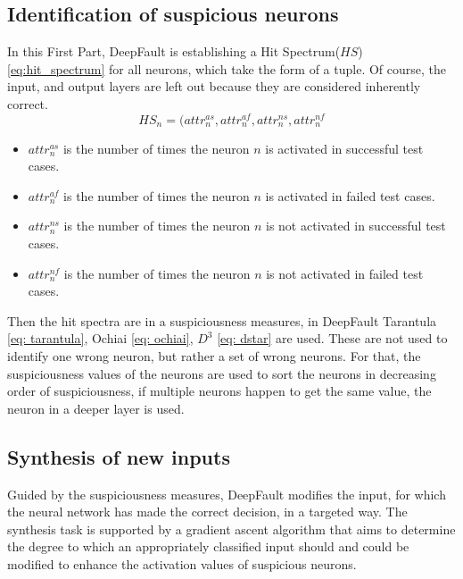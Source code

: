 \subsection{Identification of suspicious neurons}\label{subsec:identification-of-suspicious-neurons}
In this First Part, DeepFault is establishing a Hit Spectrum($HS$) \ref{eq:hit_spectrum} for all neurons, which take the form of a tuple.
Of course, the input, and output layers are left out because they are considered inherently correct.
\begin{equation}
    HS_n = (attr_n^{as}, attr_n^{af}, attr_n^{ns}, attr_n^{nf}\label{eq:hit_spectrum}
\end{equation}
\begin{itemize}
    \item $attr^{as}_n$ is the number of times the neuron $n$ is activated in successful test cases.
    \item $attr^{af}_n$ is the number of times the neuron $n$ is activated in failed test cases.
    \item $attr^{ns}_n$ is the number of times the neuron $n$ is not activated in successful test cases.
    \item $attr^{nf}_n$ is the number of times the neuron $n$ is not activated in failed test cases.
\end{itemize}
Then the hit spectra are in a suspiciousness measures, in DeepFault Tarantula \ref{eq: tarantula}, Ochiai \ref{eq: ochiai}, $D^3$ \ref{eq: dstar} are used.
These are not used to identify one wrong neuron, but rather a set of wrong neurons.
For that, the suspiciousness values of the neurons are used to sort the neurons in decreasing order of suspiciousness, if multiple neurons happen to get the same value, the neuron in a deeper layer is used.

\subsection{Synthesis of new inputs}\label{subsec:synthesis-of-new-inputs}
Guided by the suspiciousness measures, DeepFault modifies the input, for which the neural network has made the correct decision, in a targeted way.
The synthesis task is supported by a gradient ascent algorithm that aims to determine the degree to which an appropriately classified input should and could be modified to enhance the activation values of suspicious neurons.